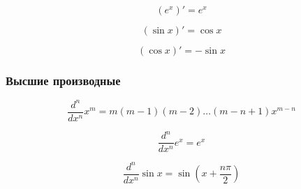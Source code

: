 \documentclass[a4paper,12pt]{article}
\begin{document}
\begin{equation}
(e^x)' = e^x
\end{equation}

\begin{equation}
(\sin x)' = \cos x
\end{equation}

\begin{equation}
(\cos x)' = -\sin x
\end{equation}

\subsubsection{Высшие производные}

\begin{equation}
\frac{d^n}{dx^n} x^m = m(m-1)(m-2)\dots(m-n+1)x^{m-n}
\end{equation}

\begin{equation}
\frac{d^n}{dx^n} e^x = e^x
\end{equation}

\begin{equation}
\frac{d^n}{dx^n} \sin x = \sin\left(x + \frac{n\pi}{2}\right)
\end{equation}
\end{document}
